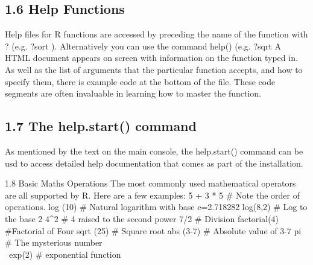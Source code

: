 \subsection{1.6 Help Functions}
Help files for R functions are accessed by preceding the name of the function with ? (e.g. ?sort
). Alternatively you can use the command help() (e.g. ?sqrt
A HTML document appears on screen with information on the function typed in. As well
as the list of arguments that the particular function accepts, and how to specify them, there is
example code at the bottom of the file. These code segments are often invaluable in learning
how to master the function.

\subsection{1.7 The help.start() command}
As mentioned by the text on the main console, the help.start() command can be usd to
access detailed help documentation that comes as part of the installation.

1.8 Basic Maths Operations
The most commonly used mathematical operators are all supported by R. Here are a few
examples:
5 + 3 * 5 # Note the order of operations.
log (10) # Natural logarithm with base e=2.718282
log(8,2) # Log to the base 2
4^2 # 4 raised to the second power
7/2 # Division
factorial(4) #Factorial of Four
sqrt (25) # Square root
abs (3-7) # Absolute value of 3-7
pi # The mysterious number \\\
exp(2) # exponential function

